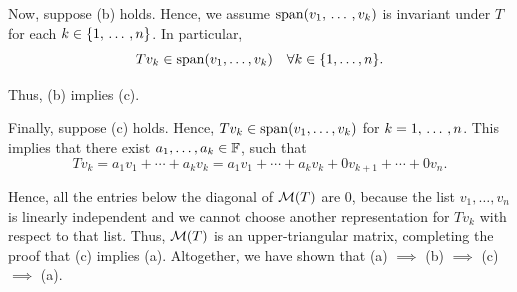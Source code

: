 \begin{prf}
  \StepTwo Now, suppose (b) holds. Hence, we assume $\operatorname{span} (v_1, {\, \ldots \,\,}, v_k)$ is invariant under $T$ for each $k \in \{1, {\, \ldots \,\,}, n\}$. In particular,
  \begin{equation}
    T v_k \in \operatorname{span} (v_1, \ldots, v_k) \quad \forall k \in \{1, \ldots, n\}.
  \end{equation}

  Thus, (b) implies (c).

  \StepThree Finally, suppose (c) holds. Hence, $T v_k \in \operatorname{span} (v_1, \ldots, v_k)$ for $k = 1, {\, \ldots \,\,}, n$. This implies that there exist $a_1, \dots, a_k \in \mathbb{F}$, such that
  \begin{equation}
    \label{eq: equation for T v_k}
    T v_k = a_1 v_1 + \cdots + a_k v_k = a_1 v_1 + \cdots + a_k v_k + 0 v_{k+1} + \cdots + 0 v_n.
  \end{equation}

  Hence, all the entries below the diagonal of $\mathcal{M} (T)$ are $0$, because the list $v_1, \ldots, v_n$ is linearly independent and we cannot choose another representation for $T v_k$ with respect to that list. Thus, $\mathcal{M}(T)$ is an upper-triangular matrix, completing the proof that (c) implies (a).
  Altogether, we have shown that (a) $\implies$ (b) $\implies$ (c) $\implies$ (a).
\end{prf}

